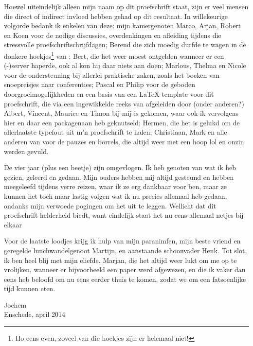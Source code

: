 Hoewel uiteindelijk alleen mijn naam op dit proefschrift staat, zijn er veel mensen die direct of indirect invloed hebben gehad op dit resultaat.
In willekeurige volgorde bedank ik enkelen van deze:
mijn kamergenoten Marco, Arjan, Robert en Koen voor de nodige discussies, overdenkingen en afleiding tijdens die stressvolle proefschriftschrijfdagen;
Berend die zich moedig durfde te wagen in de donkere hoekjes\footnote{Ho eens even, zoveel van die hoekjes zijn er helemaal niet!} van \Starburst;
Bert, die het weer moest ontgelden wanneer er een \mbox{(-)}server haperde, ook al kon hij daar niets aan doen;
Marlous, Thelma en Nicole voor de ondersteuning bij allerlei praktische zaken, zoals het boeken van snoepreisjes naar conferenties;
Pascal en Philip voor de geboden doorgroeimogelijkheden en een basis van een \LaTeX-template voor dit proefschrift, die via een ingewikkelde reeks van afgeleiden door (onder anderen?\@) Albert, Vincent, Maurice en Timon bij mij is gekomen, waar ook ik vervolgens hier en daar een 
\mbox{package\hspace{-.8em}naan}
heb geknutseld;
Hermen, die het is gelukd om de allerlaatste typefout uit m'n proefschrift te halen;
Christiaan, Mark en alle anderen van  voor de pauzes en borrels, die altijd weer met een hoop lol en onzin werden gevuld.

De vier jaar (plus een beetje) zijn omgevlogen.
Ik heb genoten van wat ik heb gezien, geleerd en gedaan.
Mijn ouders hebben mij altijd gesteund en hebben meegeleefd tijdens verre reizen, waar ik ze erg dankbaar voor ben, maar ze kunnen het toch maar lastig volgen wat ik nu precies allemaal heb gedaan, ondanks mijn verwoede pogingen om het uit te leggen.
Wellicht dat dit proefschrift helderheid biedt, want eindelijk staat het nu eens allemaal netjes bij elkaar\ppp

Voor de laatste loodjes krijg ik hulp van mijn paranimfen, mijn beste vriend en geregelde lunchwandelgenoot Martijn, en aanstaande schoonvader Henk.
Tot slot, ik ben heel blij met mijn
eliefde, Marjan,
die het altijd weer lukt om me op te vrolijken, wanneer er bijvoorbeeld een paper werd afgewezen, en die ik vaker dan eens heb beloofd om nu eens eerder thuis te komen, zodat we om een fatsoenlijke tijd kunnen eten.

\vspace{2em}

Jochem\\
Enschede, april 2014

